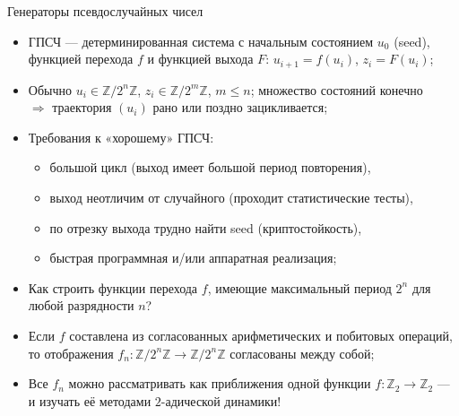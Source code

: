 \documentclass[serif, aspectratio=169]{beamer}
\begin{document}
\begin{frame}{Генераторы псевдослучайных чисел}
    \begin{itemize}
        \item ГПСЧ --- детерминированная система с начальным состоянием $u_0$ (seed), функцией перехода $f$ и функцией выхода $F$: $u_{i+1}=f(u_i)$, $z_i=F(u_i)$;
        \item Обычно $u_i\in\mathbb{Z}/2^n\mathbb{Z}$, $z_i\in\mathbb{Z}/2^m\mathbb{Z}$, $m\leqslant n$; множество состояний конечно\\ $\Rightarrow$ траектория $(u_i)$ рано или поздно зацикливается;
        \item Требования к «хорошему» ГПСЧ:
        \begin{itemize}
            \item большой цикл (выход имеет большой период повторения),
            \item выход неотличим от случайного (проходит статистические тесты),
            \item по отрезку выхода трудно найти seed (криптостойкость),
            \item быстрая программная и/или аппаратная реализация;
        \end{itemize}
        \item Как строить функции перехода $f$, имеющие максимальный период $2^n$ для любой разрядности $n$?
        \item Если $f$ составлена из согласованных арифметических и побитовых операций, то отображения $f_n:\mathbb{Z}/2^n\mathbb{Z}\to\mathbb{Z}/2^n\mathbb{Z}$ согласованы между собой;
        \item Все $f_n$ можно рассматривать как приближения одной функции $f:\mathbb{Z}_2\to\mathbb{Z}_2$ --- и изучать её методами $2$-адической динамики!
    \end{itemize}

    \note{
        \begin{itemize}
            \item ---
        \end{itemize}
    }
\end{frame}
\end{document}
